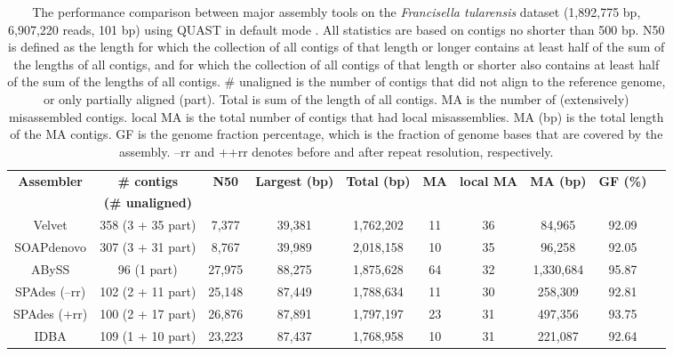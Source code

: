 \begin{table}[h!]
\begin{center}
\caption{The performance comparison between major assembly tools on the \emph{Francisella tularensis} dataset  (1,892,775 bp, 6,907,220 reads, 101 bp)  using QUAST in default mode \cite{quast}. 
All statistics are based on contigs no shorter than 500 bp. N50 is defined as the length for which the collection of all contigs of that length or longer contains at least half of the sum of the lengths of all contigs, and for which the collection of all contigs of that length or shorter also contains at least half of the sum of the lengths of all contigs.  
\# unaligned is the number of contigs that did not align to the reference genome, or only partially aligned (part).  
Total is sum of the length of all contigs. 
MA is the number of (extensively) misassembled contigs.  
local MA is the total number of contigs that had local misassemblies. 
MA (bp) is the total length of the MA contigs.  
GF is the genome fraction percentage, which is the fraction of genome bases that are covered by the assembly. 
--rr and ++rr denotes before and after repeat resolution, respectively.}
\begin{tabular}{|c|c|c|c|c|c|c|c|c|c}
\hline
\textbf{Assembler} 			&{\bf \# contigs }		& \textbf{N50}	& \textbf{Largest (bp)}	& \textbf{Total (bp) }	&\textbf{MA}	&\textbf{local MA}	& {\bf MA (bp)} 		& \textbf{GF (\%)} \\ 
 						&{\bf (\# unaligned) }		& 			& 					& 				&			& 			& 				& \\ \hline
Velvet					& 358 (3 + 35 part)		& 7,377		& 39,381				& 1,762,202 		& 11			& 36			& 84,965			& 92.09			  \\ \hline
SOAPdenovo 				& 307 (3 + 31 part)		& 8,767		& 39,989				& 2,018,158 		& 10			& 35			& 96,258			& 92.05				\\ \hline
ABySS					& 96 (1 part)  			& 27,975  		& 88,275				& 1,875,628		& 64  		& 32			& 1,330,684		& 95.87  			 	 \\ \hline
SPAdes (--rr)				& 102 (2 + 11 part) 		&  25,148		& 87,449				& 1,788,634		& 11 			& 30			& 258,309			& 92.81			 	 \\ \hline
SPAdes (+rr)				& 100 (2 + 17 part) 		&  26,876		& 87,891				& 1,797,197 		& 23 			& 31			& 497,356			& 93.75			 	 \\ \hline
IDBA						& 109 (1 + 10 part)		& 23,223 		& 87,437 				& 1,768,958		& 10			& 31			& 221,087			& 92.64  				 \\ \hline

\end{tabular}
\end{center}
\end{table}
